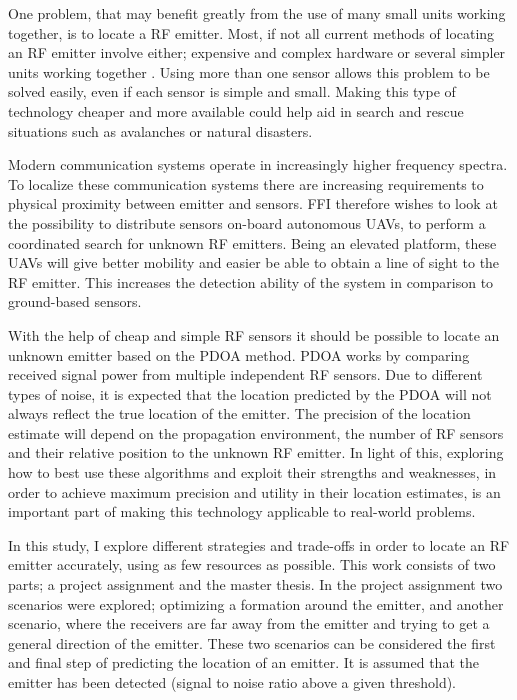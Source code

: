 \documentclass[10pt,a4paper]{book}
\begin{document}
One problem, that may benefit greatly from the use of many small units working together, is to locate a \gls{RF} emitter. Most, if not all current methods of locating an \gls{RF} emitter involve either; expensive and complex hardware or several simpler units working together \citep{jackson2011emitter}. Using more than one sensor allows this problem to be solved easily, even if each sensor is simple and small. Making this type of technology cheaper and more available could help aid in search and rescue situations such as avalanches or natural disasters.

Modern communication systems operate in increasingly higher frequency spectra. To localize these communication systems there are increasing requirements to physical proximity between emitter and sensors. \gls{FFI} therefore wishes to look at the possibility to distribute sensors on-board autonomous \glspl{UAV}, to perform a coordinated search for unknown \gls{RF} emitters. Being an elevated platform, these \glspl{UAV} will give better mobility and easier be able to obtain a line of sight to the \gls{RF} emitter. This increases the detection ability of the system in comparison to ground-based sensors.

With the help of cheap and simple \gls{RF} sensors it should be possible to locate an unknown emitter based on the \gls{PDOA} method. \gls{PDOA} works by comparing received signal power from multiple independent RF sensors. Due to different types of noise, it is expected that the location predicted by the \gls{PDOA} will not always reflect the true location of the emitter. The precision of the location estimate will depend on the propagation environment, the number of \gls{RF} sensors and their relative position to the unknown \gls{RF} emitter. In light of this, exploring how to best use these algorithms and exploit their strengths and weaknesses, in order to achieve maximum precision and utility in their location estimates, is an important part of making this technology applicable to real-world problems.

\newpage

In this study, I explore different strategies and trade-offs in order to locate an \gls{RF} emitter accurately, using as few resources as possible. This work consists of two parts; a project assignment and the master thesis. In the project assignment two scenarios were explored; optimizing a formation around the emitter, and another scenario, where the receivers are far away from the emitter and trying to get a general direction of the emitter. These two scenarios can be considered the first and final step of predicting the location of an emitter. It is assumed that the emitter has been detected (signal to noise ratio above a given threshold).
\end{document}
